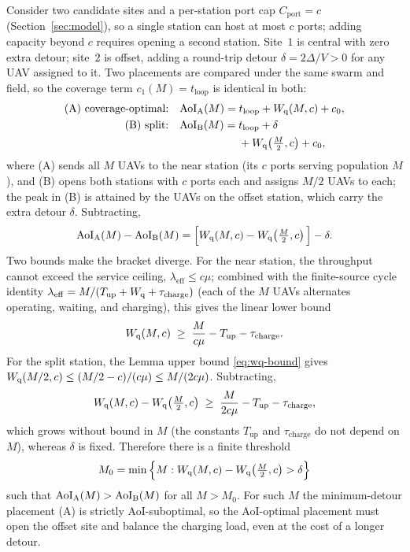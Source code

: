 \begin{IEEEproof}
Consider two candidate sites and a per-station port cap $C_{\mathrm{port}}=c$
(Section~\ref{sec:model}), so a single station can host at most $c$ ports; adding
capacity beyond $c$ requires opening a second station. Site~$1$ is central with
zero extra detour; site~$2$ is offset, adding a round-trip detour
$\delta=2\Delta/V>0$ for any UAV assigned to it. Two placements are compared under
the same swarm and field, so the coverage term $c_1(M)=t_{\mathrm{loop}}$ is
identical in both:
\begin{align}
\text{(A) coverage-optimal:}\quad
&\Aoi_{\mathrm A}(M) = t_{\mathrm{loop}} + \Wq(M,c) + c_0, \\
\text{(B) split:}\quad
&\Aoi_{\mathrm B}(M) = t_{\mathrm{loop}} + \delta \nonumber\\
&\hphantom{\Aoi_{\mathrm B}(M) ={}} + \Wq\!\left(\tfrac{M}{2},c\right) + c_0 ,
\end{align}
where (A) sends all $M$ UAVs to the near station (its $c$ ports serving population
$M$), and (B) opens both stations with $c$ ports each and assigns $M/2$ UAVs to
each; the peak in (B) is attained by the UAVs on the offset station, which carry
the extra detour $\delta$. Subtracting,
\begin{equation}
\mathrm{AoI}_{\mathrm A}(M)-\mathrm{AoI}_{\mathrm B}(M)
= \Big[W_{\mathrm q}(M,c)-W_{\mathrm q}\!\left(\tfrac{M}{2},c\right)\Big] - \delta .
\end{equation}
Two bounds make the bracket diverge. For the near station, the throughput cannot
exceed the service ceiling, $\lambda_{\mathrm{eff}}\le c\mu$; combined with the
finite-source cycle identity
$\lambda_{\mathrm{eff}}=M/(T_{\mathrm{up}}+W_{\mathrm q}+\tau_{\mathrm{charge}})$ (each of
the $M$ UAVs alternates operating, waiting, and charging), this gives the linear
lower bound
\begin{equation}
W_{\mathrm q}(M,c)\;\ge\;\frac{M}{c\mu}-T_{\mathrm{up}}-\tau_{\mathrm{charge}} .
\end{equation}
For the split station, the Lemma upper bound \eqref{eq:wq-bound} gives
$W_{\mathrm q}(M/2,c)\le (M/2-c)/(c\mu)\le M/(2c\mu)$. Subtracting,
\begin{equation}
W_{\mathrm q}(M,c)-W_{\mathrm q}\!\left(\tfrac{M}{2},c\right)
\;\ge\;\frac{M}{2c\mu}-T_{\mathrm{up}}-\tau_{\mathrm{charge}},
\end{equation}
which grows without bound in $M$ (the constants $T_{\mathrm{up}}$ and
$\tau_{\mathrm{charge}}$ do not depend on $M$), whereas $\delta$ is fixed.
Therefore there is a finite threshold
\begin{equation}
M_0 = \min\Big\{ M : W_{\mathrm q}(M,c)-W_{\mathrm q}\!\left(\tfrac{M}{2},c\right) > \delta \Big\}
\end{equation}
such that $\mathrm{AoI}_{\mathrm A}(M)>\mathrm{AoI}_{\mathrm B}(M)$ for all $M>M_0$. For such $M$
the minimum-detour placement (A) is strictly AoI-suboptimal, so the AoI-optimal
placement must open the offset site and balance the charging load, even at the cost
of a longer detour.
\end{IEEEproof}

